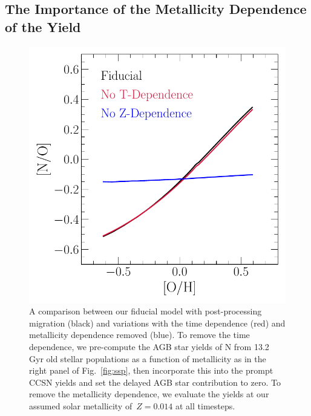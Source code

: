 \documentclass[ms.tex]{subfiles}
\begin{document}
\subsection{The Importance of the Metallicity Dependence of the Yield}
\label{sec:results:t_z_dep_comp}

\begin{figure}
\centering
\includegraphics[scale = 0.63]{t_z_dep_comp.pdf}
\caption{
A comparison between our fiducial model with post-processing migration (black)
and variations with the time dependence (red) and metallicity dependence 
removed (blue).
To remove the time dependence, we pre-compute the AGB star yields of N from
13.2 Gyr old stellar populations as a function of metallicity as in the right
panel of Fig.~\ref{fig:ssp}, then incorporate this into the prompt CCSN yields
and set the delayed AGB star contribution to zero.
To remove the metallicity dependence, we evaluate the yields at our assumed
solar metallicity of~$Z = 0.014$ at all timesteps.
}
\label{fig:t_z_dep_comp}
\end{figure}
\end{document}
